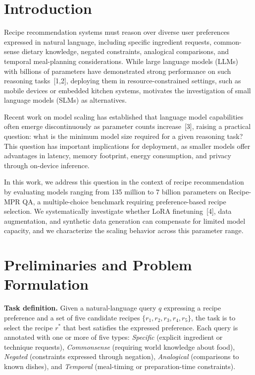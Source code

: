 \documentclass{article}
\begin{document}
\section{Introduction}

Recipe recommendation systems must reason over diverse user preferences expressed in natural language, including specific ingredient requests, common-sense dietary knowledge, negated constraints, analogical comparisons, and temporal meal-planning considerations. While large language models (LLMs) with billions of parameters have demonstrated strong performance on such reasoning tasks~[1,2], deploying them in resource-constrained settings, such as mobile devices or embedded kitchen systems, motivates the investigation of small language models (SLMs) as alternatives.

Recent work on model scaling has established that language model capabilities often emerge discontinuously as parameter counts increase~[3], raising a practical question: what is the minimum model size required for a given reasoning task? This question has important implications for deployment, as smaller models offer advantages in latency, memory footprint, energy consumption, and privacy through on-device inference.

In this work, we address this question in the context of recipe recommendation by evaluating models ranging from 135 million to 7 billion parameters on Recipe-MPR QA, a multiple-choice benchmark requiring preference-based recipe selection. We systematically investigate whether LoRA finetuning~[4], data augmentation, and synthetic data generation can compensate for limited model capacity, and we characterize the scaling behavior across this parameter range.

\section{Preliminaries and Problem Formulation}

\textbf{Task definition.} Given a natural-language query $q$ expressing a recipe preference and a set of five candidate recipes $\{r_1, r_2, r_3, r_4, r_5\}$, the task is to select the recipe $r^*$ that best satisfies the expressed preference. Each query is annotated with one or more of five types: \textit{Specific} (explicit ingredient or technique requests), \textit{Commonsense} (requiring world knowledge about food), \textit{Negated} (constraints expressed through negation), \textit{Analogical} (comparisons to known dishes), and \textit{Temporal} (meal-timing or preparation-time constraints).
\end{document}
